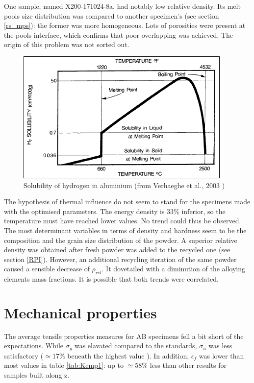 One sample, named X200-171024-8a, had notably low relative density. Its melt pools size distribution was compared to another specimen's (see section \ref{rs_mps}): the former was more homogeneous. Lots of porosities were present at the pools interface, which confirms that poor overlapping was achieved. The origin of this problem was not sorted out. \\


\begin{figure}[ht]
	\centering
	\centerline{\includegraphics[scale=0.75]{Images/Solub}}
	\decoRule
	\caption[Solubility of hydrogen in aluminium.]{Solubility of hydrogen in aluminium (from Verhaeghe et al., 2003 \parencite{Verhaeghe})}
	\label{fig:Solub}
\end{figure}

The hypothesis of thermal influence do not seem to stand for the specimens made with the optimised parameters. The energy density is 33\% inferior, so the temperature must have reached lower values. No trend could thus be observed. The most determinant variables in terms of density and hardness seem to be the composition and the grain size distribution of the powder. A superior relative density was obtained after fresh powder was added to the recycled one (see section \ref{RPI}). However, an additional recycling iteration of the same powder caused a sensible decrease of $\rho_{rel}$. It dovetailed with a diminution of the alloying elements mass fractions. It is possible that both trends were correlated.

\section{Mechanical properties}
\label{DMPP}
The average tensile properties measures for AB specimens fell a bit short of the expectations. While $\sigma_y$ was elavated compared to the standards, $\sigma_u$ was less satisfactory ($\simeq 17\%$ beneath the highest value \parencite{EOS}). In addition, $\epsilon_f$ was lower than most values in table \ref{tab:Kemp1}: up to $\simeq 58\%$ less than other results for samples built along z. \\%

